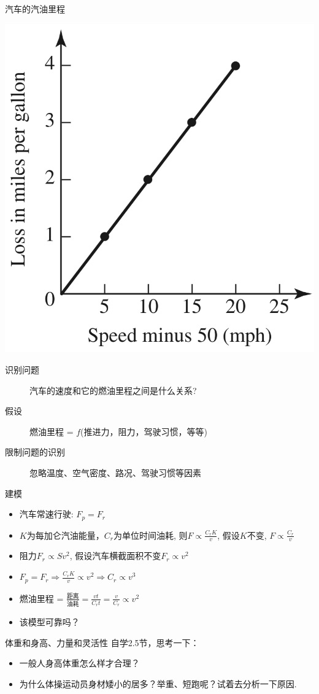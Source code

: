 \documentclass[UTF8]{ctexbeamer}
\begin{document}
\begin{frame}{汽车的汽油里程}
  \begin{center}
    \includegraphics[width=.2\textwidth{}]{papersays.png}
  \end{center}

  \begin{description}
  \item[识别问题] 汽车的速度和它的燃油里程之间是什么关系?
  \item[假设] 燃油里程 = $f$(推进力，阻力，驾驶习惯，等等)
  \item[限制问题的识别] 忽略温度、空气密度、路况、驾驶习惯等因素
  \end{description}

\end{frame}

\begin{frame}{建模}

  \begin{itemize}
  \item 汽车常速行驶: $F_p = F_r$
  \item $K$为每加仑汽油能量，$C_r$为单位时间油耗, 则$F \propto \frac{C_rK}{v}$, 假设$K$不变, $F \propto \frac{C_r}{v}$
  \item 阻力$F_r \propto Sv^2$, 假设汽车横截面积不变$F_r \propto v^2$
  \item $F_p = F_r \Rightarrow \frac{C_rK}{v} \propto v^2 \Rightarrow C_r \propto v^3$
  \item 燃油里程 = $\frac{\text{距离}}{\text{油耗}} = \frac{vt}{C_rt}=\frac{v}{C_r}\propto v^2$
  \item 该模型可靠吗？
  \end{itemize}
  
\end{frame}

\begin{frame}{体重和身高、力量和灵活性}
  自学2.5节，思考一下：

  \begin{itemize}
  \item 一般人身高体重怎么样才合理？
  \item 为什么体操运动员身材矮小的居多？举重、短跑呢？试着去分析一下原因.
  \end{itemize}

\end{frame}
\end{document}
